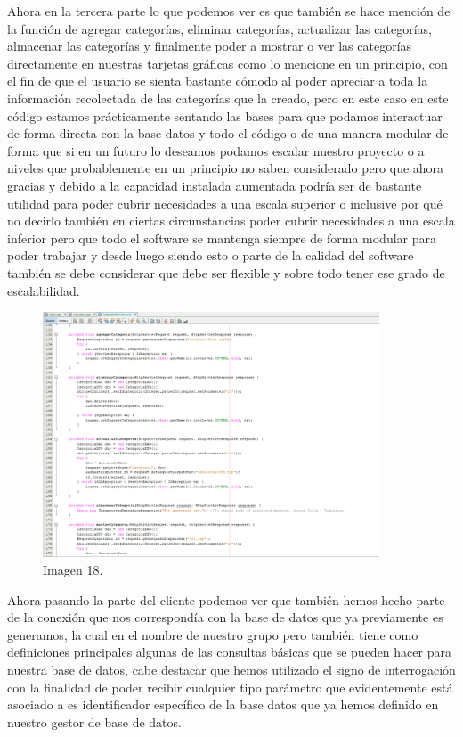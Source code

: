 \documentclass[10pt,a4paper]{article}
\begin{document}
Ahora en la tercera parte lo que podemos ver es que también se hace mención de la función de agregar categorías, eliminar categorías, actualizar las categorías, almacenar las categorías y finalmente poder a mostrar o ver las categorías directamente en nuestras tarjetas gráficas como lo mencione en un principio, con el fin de que el usuario se sienta bastante cómodo al poder apreciar a toda la información recolectada de las categorías que la creado, pero en este caso en este código estamos prácticamente sentando las bases para que podamos interactuar de forma directa con la base datos y todo el código o de una manera modular de forma que si en un futuro lo deseamos podamos escalar nuestro proyecto o a niveles que probablemente en un principio no saben considerado pero que ahora gracias y debido a la capacidad instalada aumentada podría ser de bastante utilidad para poder cubrir necesidades a una escala superior o inclusive por qué no decirlo también en ciertas circunstancias poder cubrir necesidades a una escala inferior pero que todo el software se mantenga siempre de forma modular para poder trabajar y desde luego siendo esto o parte de la calidad del software también se debe considerar que debe ser flexible y sobre todo tener ese grado de escalabilidad.
\begin{figure}[h]
\centering
\includegraphics[width=10cm]{categoriaServlet3}
\caption{Imagen 18.}
\label{fig:figure1}
\end{figure}

\vspace{60mm}

Ahora pasando la parte del cliente podemos ver que también hemos hecho parte de la conexión que nos correspondía con la base de datos que ya previamente es generamos, la cual en el nombre de nuestro grupo pero también tiene como definiciones principales algunas de las consultas básicas que se pueden hacer para nuestra base de datos, cabe destacar que hemos utilizado el signo de interrogación con la finalidad de poder recibir cualquier tipo parámetro que evidentemente está asociado a es identificador específico de la base datos que ya hemos definido en nuestro gestor de base de datos.
\end{document}
